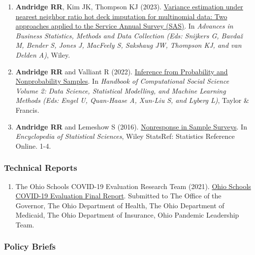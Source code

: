 \documentclass[
  english,
  letterpaper,
  DIV=11,
  numbers=noendperiod]{scrartcl}
\providecommand{\tightlist}{%
  \setlength{\itemsep}{0pt}\setlength{\parskip}{0pt}}
\begin{document}
\begin{enumerate}
\def\labelenumi{\arabic{enumi}.}
\tightlist
\item
  \textbf{Andridge RR}, Kim JK, Thompson KJ (2023).
  \href{https://doi.org/10.1002/9781119672333.ch31}{Variance estimation
  under nearest neighbor ratio hot deck imputation for multinomial data:
  Two approaches applied to the Service Annual Survey (SAS)}. In
  \emph{Advances in Business Statistics, Methods and Data Collection
  (Eds: Snijkers G, Bavdaž M, Bender S, Jones J, MacFeely S, Sakshaug
  JW, Thompson KJ, and van Delden A)}, Wiley.
\item
  \textbf{Andridge RR} and Valliant R (2022).
  \href{https://www.taylorfrancis.com/chapters/edit/10.4324/9781003025245-13/inference-probability-nonprobability-samples-rebecca-andridge-richard-valliant}{Inference
  from Probability and Nonprobability Samples}. In \emph{Handbook of
  Computational Social Science Volume 2: Data Science, Statistical
  Modelling, and Machine Learning Methods (Eds: Engel U, Quan-Haase A,
  Xun-Liu S, and Lyberg L)}, Taylor \& Francis.
\item
  \textbf{Andridge RR} and Lemeshow S (2016).
  \href{https://doi.org/10.1002/9781118445112.stat03338.pub2}{Nonresponse
  in Sample Surveys}. In \emph{Encyclopedia of Statistical Sciences},
  Wiley StatsRef: Statistics Reference Online. 1-4.
\end{enumerate}

\subsubsection{Technical Reports}\label{technical-reports}

\begin{enumerate}
\def\labelenumi{\arabic{enumi}.}
\tightlist
\item
  The Ohio Schools COVID-19 Evaluation Research Team (2021).
  \href{http://grc.osu.edu/sites/default/files/inline-files/OSCE\%20Final\%20Report\%202021.pdf}{Ohio
  Schools COVID-19 Evaluation Final Report}. Submitted to The Office of
  the Governor, The Ohio Department of Health, The Ohio Department of
  Medicaid, The Ohio Department of Insurance, Ohio Pandemic Leadership
  Team.
\end{enumerate}

\subsubsection{Policy Briefs}\label{policy-briefs}
\end{document}
